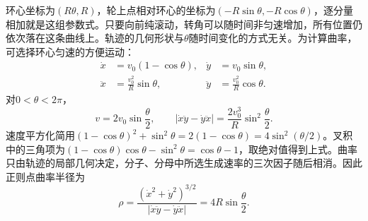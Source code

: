 \documentclass[UTF8,fontset=fandol,a4paper,11pt]{ctexart}
\begin{document}
环心坐标为$(R\theta,R)$，轮上点相对环心的坐标为$(-R\sin\theta,-R\cos\theta)$，逐分量相加就是这组参数式。只要向前纯滚动，转角可以随时间非匀速增加，所有位置仍依次落在这条曲线上。轨迹的几何形状与$\theta$随时间变化的方式无关。为计算曲率，可选择环心匀速的方便运动：
\[
\begin{aligned}
\dot x&=v_0(1-\cos\theta),&
\dot y&=v_0\sin\theta,\\
\ddot x&=\frac{v_0^2}{R}\sin\theta,&
\ddot y&=\frac{v_0^2}{R}\cos\theta.
\end{aligned}
\]
对$0<\theta<2\pi$，
\[
v=2v_0\sin\frac\theta2,\qquad
|\dot x\ddot y-\dot y\ddot x|
=\frac{2v_0^3}{R}\sin^2\frac\theta2.
\]
速度平方化简用$(1-\cos\theta)^2+\sin^2\theta=2(1-\cos\theta)=4\sin^2(\theta/2)$。叉积中的三角项为$(1-\cos\theta)\cos\theta-\sin^2\theta=\cos\theta-1$，取绝对值得到上式。曲率只由轨迹的局部几何决定，分子、分母中所选生成速率的三次因子随后相消。因此正则点曲率半径为
\[
\boxed{\rho=
\frac{(\dot x^2+\dot y^2)^{3/2}}
{|\dot x\ddot y-\dot y\ddot x|}
=4R\sin\frac\theta2}.
\]
\end{document}
